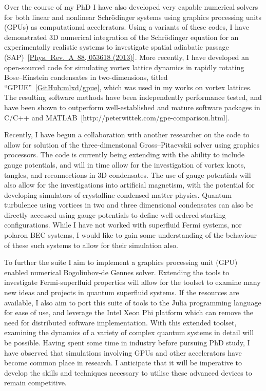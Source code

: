 \documentclass[12pt,a4paper,unicode]{moderncv}
\begin{document}
{    Over the course of my PhD I have also developed very capable numerical solvers for both linear and nonlinear Schr\"odinger systems using graphics processing units (GPUs) as computational accelerators. Using a variants of these codes, I have demonstrated 3D numerical integration of the Schr\"odinger equation for an experimentally realistic systems to investigate spatial adiabatic passage (SAP)~[\href{http://journals.aps.org/pra/abstract/10.1103/PhysRevA.88.053618}{Phys.~Rev.~A~88, 053618 (2013)}]. More recently, I have developed an open-sourced code for simulating vortex lattice dynamics in rapidly rotating Bose--Einstein condensates in two-dimensions, titled ``GPUE''~[\href{https://github.com/mlxd/gpue}{GitHub:mlxd/gpue}], which was used in my works on vortex lattices. The resulting software methods have been independently performance tested, and have been shown to outperform well-established and mature software packages in C/C++ and \textsc{MATLAB}~[http://peterwittek.com/gpe-comparison.html].

    Recently, I have begun a collaboration with another researcher on the code to allow for solution of the three-dimensional Gross--Pitaevskii solver using graphics processors. The code is currently being extending with the ability to include gauge potentials, and will in time allow for the investigation of vortex knots, tangles, and reconnections in 3D condensates. The use of gauge potentials will also allow for the investigations into artificial magnetism, with the potential for developing simulators of crystalline condensed matter physics. Quantum turbulence using vortices in two and three dimensional condensates can also be directly accessed using gauge potentials to define well-ordered starting configurations. While I have not worked with superfluid Fermi systems, nor polaron BEC systems, I would like to gain some understanding of the behaviour of these such systems to allow for their simulation also.

    To further the suite I aim to implement a graphics processing unit (GPU) enabled numerical Bogoliubov-de Gennes solver. Extending the tools to investigate Fermi-superfluid properties will allow for the toolset to examine many new ideas and projects in quantum superfluid systems. If the resources are available, I also aim to port this suite of tools to the Julia programming language for ease of use, and leverage the Intel Xeon Phi platform which can remove the need for distributed software implementation. With this extended toolset, examining the dynamics of a variety of complex quantum systems in detail will be possible. Having spent some time in industry before pursuing PhD study, I have observed that simulations involving GPUs and other accelerators have become common place in research. I anticipate that it will be imperative to develop the skills and techniques necessary to utilise these advanced devices to remain competitive.

}
\end{document}
